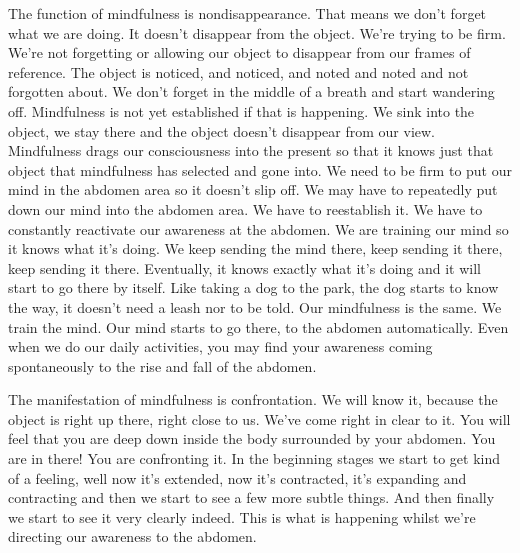 \documentclass[letterpaper,10pt,english]{sphinxmanual}
\begin{document}
\sphinxAtStartPar
The  function  of  mindfulness  is  non\sphinxhyphen{}disappearance.  That  means  we
don’t forget what we are doing. It doesn’t disappear from the object. We’re
trying  to  be  firm. We’re  not  forgetting  or  allowing  our  object  to  disappear
from our frames of reference. The object is noticed, and noticed, and noted
and noted and not forgotten about. We don’t forget in the middle of a breath
and start wandering off. Mindfulness is not yet established if that is happening. We sink into the object, we stay there and the object doesn’t disappear
from our view. Mindfulness drags our consciousness into the present so that
it  knows  just  that  object  that  mindfulness  has  selected  and  gone  into.  We
  need to be firm to put our mind in the abdomen area so it doesn’t slip off.
We may have to repeatedly put down our mind into the abdomen area. We
have to reestablish it. We have to constantly reactivate our awareness at the
abdomen. We  are  training  our  mind  so  it  knows  what  it’s  doing. We  keep
sending the mind there, keep sending it there, keep sending it there. Eventually, it knows exactly what it’s doing and it will start to go there by itself.
Like taking a dog to the park, the dog starts to know the way, it doesn’t need
a leash nor to be told. Our mindfulness is the same. We train the mind. Our
mind starts to go there, to the abdomen automatically. Even when we do our
daily activities, you may find your awareness coming spontaneously to the
rise and fall of the abdomen.

\sphinxAtStartPar
The  manifestation  of  mindfulness  is  confrontation. We  will  know  it,
because the object is right up there, right close to us. We’ve come right in
clear to it. You will feel that you are deep down inside the body surrounded
by your abdomen. You are in there! You are confronting it. In the beginning
stages we start to get kind of a feeling, well now it’s extended, now it’s contracted, it’s expanding and contracting and then we start to see a few more
subtle  things. And  then  finally  we  start  to  see  it  very  clearly  indeed. This
is what is happening whilst we’re directing our awareness to the abdomen.
\end{document}
